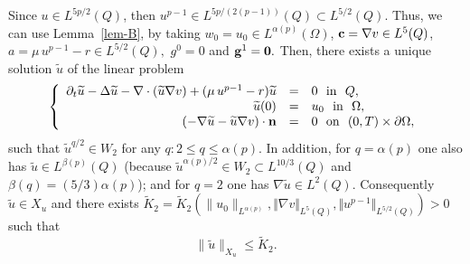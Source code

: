 \documentclass[11pt,reqno]{amsart}%
\numberwithin{equation}{section}
\begin{document}
{ Since $u\in L^{5p/2}(Q)
 $, then $u^{p-1}\in L^{5p/(2(p-1))}(Q)\subset L^{5/2}(Q)$. Thus, we can use Lemma~\ref{lem-B}, by taking $w_0=u_0\in L^{\alpha(p)}(\Omega)$, ${\bf c}=\nabla v \in L^5(Q)$, $a=\mu \, u^{p-1}-r\in L^{5/2}(Q),$ $g^0=0$ and ${\bf g}^1={\bf 0}.$ Then, there exists a unique solution $\widetilde u$  of the  linear problem
 \begin{equation}\label{lin-aux}
 \left\{
 \begin{array}{rcl}
 \partial_t  \widetilde u-\Delta \widetilde u-\nabla\cdot(\widetilde u \nabla v) +(\mu\, u^{p-1}-r) \widetilde u&=& 0\ \mbox{ in }\ Q,\\
 \widetilde u(0)&=&u_0\ \mbox{ in }\ \Omega,\\
 (-\nabla \widetilde u - \widetilde u \nabla v)\cdot{\bf n}&=&0\ \mbox{ on }\ (0,T)\times\partial\Omega,
 \end{array}
 \right.
 \end{equation}
 such that  $\widetilde u^{q/2}\in W_2$ for any $q: 2\le q \le \alpha(p).$ In addition, for $q= \alpha(p)$ one also has $\widetilde u\in L^{\beta(p)}(Q)$ (because $\widetilde u ^{\alpha(p)/2}\in W_2\subset L^{10/3}(Q)$ and $\beta(q)=(5/3)\alpha(p)$); and for $q= 2$ one has $\nabla \widetilde u\in L^2(Q)$.
Consequently $\widetilde u\in X_u$ and there exists $\widetilde{K}_2=\widetilde{K}_2(\|u_0\|_{L ^{\alpha(p)}}, \Vert \nabla v \Vert_{L^{5}(Q)}, \Vert u^{p-1}\Vert_{L^{5/2}(Q)})>0$ such that 
\begin{equation}\label{xx-2}
\|\widetilde{u}\|_{X_u}\le \widetilde{K}_2.
\end{equation}
 

 

}
\end{document}
